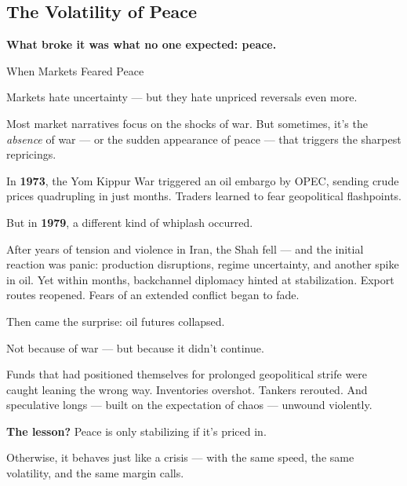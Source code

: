 \subsection{The Volatility of Peace}


\textbf{What broke it was what no one expected: peace.}

\begin{HistoricalSidebar}{When Markets Feared Peace}

  Markets hate uncertainty — but they hate unpriced reversals even more.

  \medskip
  
  Most market narratives focus on the shocks of war. But sometimes, it’s the \textit{absence} of war — or the sudden 
  appearance of peace — that triggers the sharpest repricings.

  \medskip
  
  In \textbf{1973}, the Yom Kippur War triggered an oil embargo by OPEC, sending crude prices quadrupling in just months. 
  Traders learned to fear geopolitical flashpoints.

  \medskip
  
  But in \textbf{1979}, a different kind of whiplash occurred.

  \medskip
  
  After years of tension and violence in Iran, the Shah fell — and the initial reaction was panic: production disruptions, 
  regime uncertainty, and another spike in oil. Yet within months, backchannel diplomacy hinted at stabilization. Export 
  routes reopened. Fears of an extended conflict began to fade.

  \medskip
  
  Then came the surprise: oil futures collapsed.

  \medskip
  
  Not because of war — but because it didn’t continue.

  \medskip
  
  Funds that had positioned themselves for prolonged geopolitical strife were caught leaning the wrong way. Inventories 
  overshot. Tankers rerouted. And speculative longs — built on the expectation of chaos — unwound violently.
  
  \medskip
  
  \textbf{The lesson?} Peace is only stabilizing if it’s priced in.

  \medskip
  
  Otherwise, it behaves just like a crisis — with the same speed, the same volatility, and the same margin calls.
  
\end{HistoricalSidebar}
  

